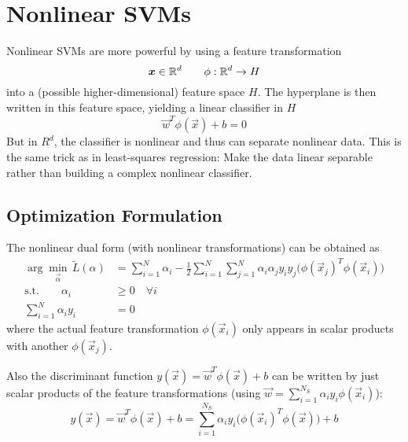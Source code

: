 		\section{Nonlinear SVMs}
			Nonlinear SVMs are more powerful by using a feature transformation
			\begin{equation}
				\bm{x} \in \mathbb{R}^d \qquad \phi : \mathbb{R}^d \rightarrow H
			\end{equation}
			into a (possible higher-dimensional) feature space \(H\). The hyperplane is then written in this feature space, yielding a linear classifier in \(H\)
			\begin{equation}
				\vec{w}^T \phi(\vec{x}) + b = 0
			\end{equation}
			But in \(R^d\), the classifier is nonlinear and thus can separate nonlinear data. This is the same trick as in least-squares regression: Make the data linear separable rather than building a complex nonlinear classifier.

			\subsection{Optimization Formulation}
				The nonlinear dual form (with nonlinear transformations) can be obtained as
				\begin{align}
					\arg\min_{ \vec{\alpha} } \, \tilde{L}(\alpha) & = \sum_{i = 1}^{N} \alpha_i - \frac{1}{2} \sum_{i = 1}^{N} \sum_{j = 1}^{N} \alpha_i \alpha_j y_i y_j \big(\phi(\vec{x}_j)^T \phi(\vec{x}_i)\big) \\
					\textrm{s.t.} \qquad
					\alpha_i                                       & \geq 0 \quad\forall i                                                                                                                             \\
					\sum_{i = 1}^{N} \alpha_i y_i                  & = 0
				\end{align}
				where the actual feature transformation \( \phi(\vec{x}_i) \) only appears in scalar products with another \( \phi(\vec{x}_j) \).

				Also the discriminant function \( y(\vec{x}) = \vec{w}^T \phi(\vec{x}) + b \) can be written by just scalar products of the feature transformations (using \( \vec{w} = \sum_{i = 1}^{N_S} \alpha_i y_i \phi(\vec{x}_i) \)):
				\begin{equation}
					y(\vec{x}) = \vec{w}^T \phi(\vec{x}) + b = \sum_{i = 1}^{N_S} \alpha_i y_i \big(\phi(\vec{x}_i)^T \phi(\vec{x})\big) + b
				\end{equation}

